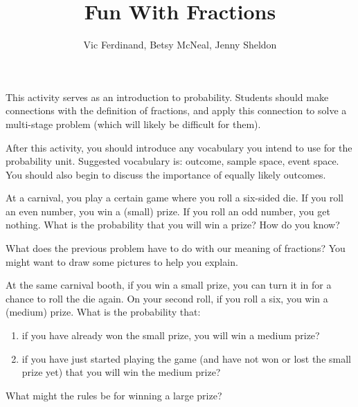 \documentclass{ximera}
\title{Fun With Fractions}
\author{Vic Ferdinand, Betsy McNeal, Jenny Sheldon}
\begin{document}
\begin{abstract}
\end{abstract}
\maketitle

\begin{instructorIntro}
This activity serves as an introduction to probability.  Students should make connections with the definition of fractions, and apply this connection to solve a multi-stage problem (which will likely be difficult for them).

After this activity, you should introduce any vocabulary you intend to use for the probability unit.  Suggested vocabulary is: outcome, sample space, event space.  You should also begin to discuss the importance of equally likely outcomes.

\end{instructorIntro}

\begin{problem}
At a carnival, you play a certain game where you roll a six-sided die.  If you roll an even number, you win a (small) prize.  If you roll an odd number, you get nothing.  What is the probability that you will win a prize?  How do you know?
\end{problem}

\begin{problem}
What does the previous problem have to do with our meaning of fractions?  You might want to draw some pictures to help you explain.
\end{problem}

\begin{problem}
At the same carnival booth, if you win a small prize, you can turn it in for a chance to roll the die again.  On your second roll, if you roll a six, you win a (medium) prize.  What is the probability that:
\begin{enumerate}
\item if you have already won the small prize, you will win a medium prize?
\item if you have just started playing the game (and have not won or lost the small prize yet) that you will win the medium prize?
\end{enumerate}

\end{problem}

\begin{problem}
What might the rules be for winning a large prize?
\end{problem}
\end{document}
